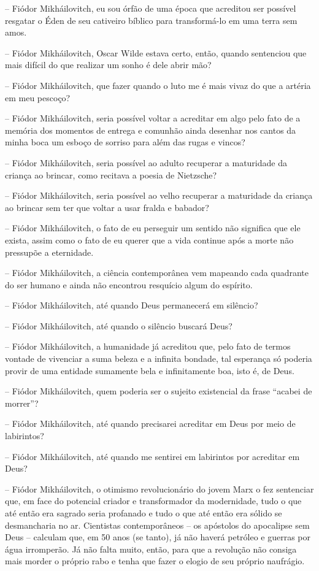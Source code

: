 -- Fiódor Mikháilovitch, eu sou órfão de uma época que acreditou ser
possível resgatar o Éden de seu cativeiro bíblico para transformá-lo em
uma terra sem amos.

-- Fiódor Mikháilovitch, Oscar Wilde estava certo, então, quando
sentenciou que mais difícil do que realizar um sonho é dele abrir mão?

-- Fiódor Mikháilovitch, que fazer quando o luto me é mais vivaz do que
a artéria em meu pescoço?

-- Fiódor Mikháilovitch, seria possível voltar a acreditar em algo pelo
fato de a memória dos momentos de entrega e comunhão ainda desenhar nos
cantos da minha boca um esboço de sorriso para além das rugas e vincos?

-- Fiódor Mikháilovitch, seria possível ao adulto recuperar a maturidade
da criança ao brincar, como recitava a poesia de Nietzsche?

-- Fiódor Mikháilovitch, seria possível ao velho recuperar a maturidade
da criança ao brincar sem ter que voltar a usar fralda e babador?

-- Fiódor Mikháilovitch, o fato de eu perseguir um sentido não significa
que ele exista, assim como o fato de eu querer que a vida continue após
a morte não pressupõe a eternidade.

-- Fiódor Mikháilovitch, a ciência contemporânea vem mapeando cada
quadrante do ser humano e ainda não encontrou resquício algum do
espírito.

-- Fiódor Mikháilovitch, até quando Deus permanecerá em silêncio?

-- Fiódor Mikháilovitch, até quando o silêncio buscará Deus?

-- Fiódor Mikháilovitch, a humanidade já acreditou que, pelo fato de
termos vontade de vivenciar a suma beleza e a infinita bondade, tal
esperança só poderia provir de uma entidade sumamente bela e
infinitamente boa, isto é, de Deus.

-- Fiódor Mikháilovitch, quem poderia ser o sujeito existencial da frase
``acabei de morrer''?

-- Fiódor Mikháilovitch, até quando precisarei acreditar em Deus por
meio de labirintos?

-- Fiódor Mikháilovitch, até quando me sentirei em labirintos por
acreditar em Deus?

-- Fiódor Mikháilovitch, o otimismo revolucionário do jovem Marx o fez
sentenciar que, em face do potencial criador e transformador da
modernidade, tudo o que até então era sagrado seria profanado e tudo o
que até então era sólido se desmancharia no ar. Cientistas
contemporâneos -- os apóstolos do apocalipse sem Deus -- calculam que,
em 50 anos (se tanto), já não haverá petróleo e guerras por água
irromperão. Já não falta muito, então, para que a revolução não consiga
mais morder o próprio rabo e tenha que fazer o elogio de seu próprio
naufrágio.

